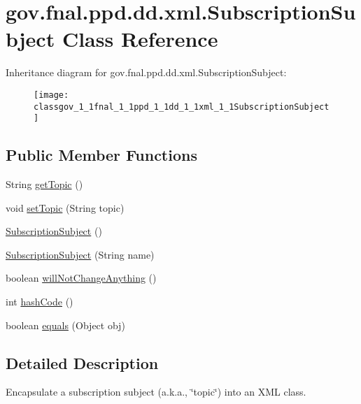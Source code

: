 \hypertarget{classgov_1_1fnal_1_1ppd_1_1dd_1_1xml_1_1SubscriptionSubject}{\section{gov.\-fnal.\-ppd.\-dd.\-xml.\-Subscription\-Subject Class Reference}
\label{classgov_1_1fnal_1_1ppd_1_1dd_1_1xml_1_1SubscriptionSubject}
}
Inheritance diagram for gov.\-fnal.\-ppd.\-dd.\-xml.\-Subscription\-Subject\-:\begin{figure}[H]
\begin{center}
\leavevmode
\texttt{[image: classgov\_1\_1fnal\_1\_1ppd\_1\_1dd\_1\_1xml\_1\_1SubscriptionSubject]}
\end{center}
\end{figure}
\subsection*{Public Member Functions}
\begin{DoxyCompactItemize}
\item 
String \hyperlink{classgov_1_1fnal_1_1ppd_1_1dd_1_1xml_1_1SubscriptionSubject_a01f2393abc6ac326202690123bda8dad}{get\-Topic} ()
\item 
void \hyperlink{classgov_1_1fnal_1_1ppd_1_1dd_1_1xml_1_1SubscriptionSubject_a83846589b011cc7e49435511dddb598e}{set\-Topic} (String topic)
\item 
\hyperlink{classgov_1_1fnal_1_1ppd_1_1dd_1_1xml_1_1SubscriptionSubject_a01d1baa11a755117fc36d96614a51c22}{Subscription\-Subject} ()
\item 
\hyperlink{classgov_1_1fnal_1_1ppd_1_1dd_1_1xml_1_1SubscriptionSubject_ab9fa2bcb8c215704cd9b51d4e829832c}{Subscription\-Subject} (String name)
\item 
boolean \hyperlink{classgov_1_1fnal_1_1ppd_1_1dd_1_1xml_1_1SubscriptionSubject_aca1d74e3e4b6dccf912b092956c551f8}{will\-Not\-Change\-Anything} ()
\item 
int \hyperlink{classgov_1_1fnal_1_1ppd_1_1dd_1_1xml_1_1SubscriptionSubject_a0c977f51ce1c32fdef687190d23a4ea7}{hash\-Code} ()
\item 
boolean \hyperlink{classgov_1_1fnal_1_1ppd_1_1dd_1_1xml_1_1SubscriptionSubject_af0e768945dc11038a1ae7a298ac328ee}{equals} (Object obj)
\end{DoxyCompactItemize}


\subsection{Detailed Description}
Encapsulate a subscription subject (a.\-k.\-a., \char`\"{}topic\char`\"{}) into an X\-M\-L class. 

